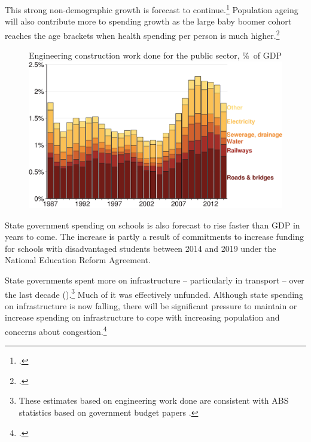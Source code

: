 \documentclass[twoside,english]{palatinob5ona4portrait}
\begin{document}
This strong non-demographic growth is forecast to continue.\footcite{ProductivityCommission2013AgeingAustralia}  Population ageing will also contribute more to spending growth as the large baby boomer cohort reaches the age brackets when health spending per person is much higher.\footcite[][26]{DaleyWoodWeidmannEtAl2014}  

\begin{figure}[!t]
%
{Engineering construction work done for the public sector, \%\ of GDP}
\includegraphics[width=1.1\columnwidth]{Fiscal-challenges/figure/Figure14-1.pdf}

\end{figure}

State government spending on schools is also forecast to rise faster than GDP in years to come. The increase is partly a result of commitments to increase funding for schools with disadvantaged students between 2014 and 2019 under the National Education Reform Agreement.  

State governments spent more on infrastructure – particularly in transport – over the last decade ().\footnote{These estimates based on engineering work done are consistent with ABS statistics based on government budget papers \textcite[][41]{PBO2015a}.}  Much of it was effectively unfunded. Although state spending on infrastructure is now falling, there will be significant pressure to maintain or increase spending on infrastructure to cope with increasing population and concerns about congestion.\footcites[][112-128]{KellyDonegan2015}{InfrastructureAustralia2015-InfrastructureAudit}
\end{document}
